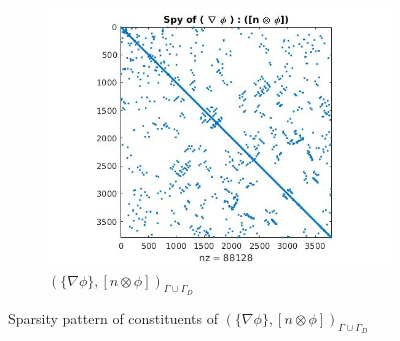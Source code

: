 \documentclass[a4paper,openany]{book}
\begin{document}
\begin{figure}
\begin{subfigure}{\textwidth}
  \includegraphics[width=\textwidth]{figure3.jpg}
  \caption{$(\lbrace \nabla \phi \rbrace,[n \otimes \phi])_{\Gamma \cup \Gamma_D}$}
  \label{fig:figure3}
\end{subfigure}
\caption{Sparsity pattern of constituents of $(\lbrace \nabla \phi  \rbrace,[n \otimes \phi])_{\Gamma \cup \Gamma_D}$}
\label{figure_3_all}
\end{figure}
\end{document}
